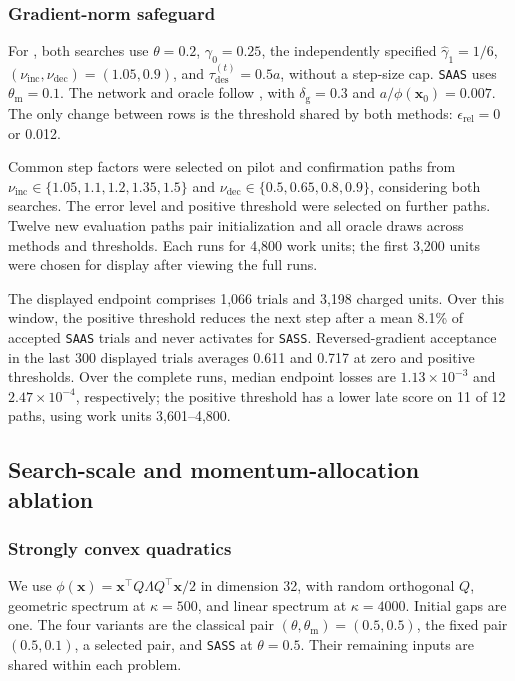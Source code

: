 \documentclass{article}
\begin{document}
\subsubsection{Gradient-norm safeguard}
\label{app:exp_nn_search_diagnostics}

For , both searches use
\(\theta=0.2\), \(\gamma_0=0.25\), the independently specified
\(\hat\gamma_1=1/6\),
\((\nu_{\mathrm{inc}},\nu_{\mathrm{dec}})=(1.05,0.9)\), and
\(\tau_{\mathrm{des}}^{(t)}=0.5a\), without a step-size cap.
\texttt{SAAS} uses \(\theta_{\mathrm m}=0.1\).
The network and oracle follow , with
\(\delta_{\mathrm g}=0.3\) and \(a/\phi(\bm x_0)=0.007\).
The only change between rows is the threshold shared by both methods:
\(\epsilon_{\mathrm{rel}}=0\) or 0.012.

Common step factors were selected on pilot and confirmation paths
from \(\nu_{\mathrm{inc}}\in\{1.05,1.1,1.2,1.35,1.5\}\) and
\(\nu_{\mathrm{dec}}\in\{0.5,0.65,0.8,0.9\}\), considering both searches.
The error level and positive threshold were selected on further paths.
Twelve new evaluation paths pair initialization and all oracle draws
across methods and thresholds. Each runs for 4,800 work units;
the first 3,200 units were chosen for display after viewing the full runs.

The displayed endpoint comprises 1,066 trials and 3,198 charged units.
Over this window, the positive threshold reduces the next step after
a mean 8.1\% of accepted \texttt{SAAS} trials and never activates for
\texttt{SASS}. Reversed-gradient acceptance in the last 300
displayed trials averages 0.611 and 0.717 at zero and positive thresholds.
Over the complete runs, median endpoint losses are
\(1.13\times10^{-3}\) and \(2.47\times10^{-4}\), respectively;
the positive threshold has a lower late score on 11 of 12 paths,
using work units 3,601--4,800.

\subsection{Search-scale and momentum-allocation ablation}
\label{app:exp_allocation_ablation}

\subsubsection{Strongly convex quadratics}
\label{app:exp_selected_ablation_details}

We use \(\phi(\bm x)=\bm x^\top Q\Lambda Q^\top\bm x/2\) in
dimension 32, with random orthogonal \(Q\), geometric spectrum at
\(\kappa=500\), and linear spectrum at \(\kappa=4000\).
Initial gaps are one. The four variants are the classical pair
\((\theta,\theta_{\mathrm m})=(0.5,0.5)\), the fixed pair \((0.5,0.1)\),
a selected pair, and \texttt{SASS} at \(\theta=0.5\).
Their remaining inputs are shared within each problem.
\end{document}
